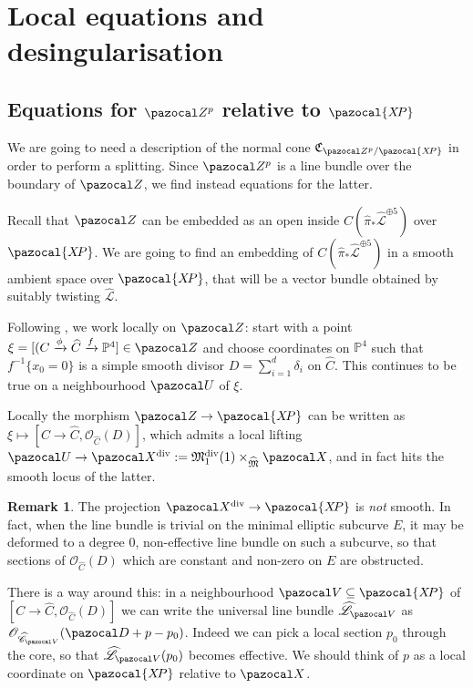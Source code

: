 \documentclass[11pt]{amsart}
\newcommand{\PP}{\mathbb P}
\newcommand{\OO}{\mathcal O}
\renewcommand{\to}{\rightarrow}
\newcommand{\X}{\pazocal X}
\newcommand{\XP}{\pazocal{X\!P}}
\newcommand{\hL}{\widehat{\mathcal L}}
\newcommand{\hC}{\widehat{\mathcal C}}
\newcommand{\Z}{\pazocal Z}
\newcommand{\MM}{\mathfrak M}
\newcommand{\hM}{\widehat{\mathfrak M}}
\newcommand{\Pic}{\operatorname{Pic}}
\theoremstyle{plain}
\theoremstyle{definition}
\newtheorem{remark}[thm]{Remark}
\begin{document}
\section{Local equations and desingularisation}\label{sec:equations}
\subsection{Equations for $\Z^p$ relative to $\XP$}
We are going to need a description of the normal cone $\mathfrak C_{\Z^p/\XP}$ in order to perform a splitting.
Since $\Z^p$ is a line bundle over the boundary of $\Z$, we find instead equations for the latter.

Recall that $\Z$ can be embedded as an open inside $C(\hat{\pi}_*\hL^{\oplus 5})$ over $\XP$. We are going to find an embedding of $C(\hat{\pi}_*\hL^{\oplus 5})$ in a smooth ambient space over $\XP$, that will be a vector bundle obtained by suitably twisting $\hL$.

Following \cite{HL}, we work locally on $\Z$: start with a point $\xi=[(C\xrightarrow{\phi}\widehat{C}\xrightarrow{f}\PP^4]\in\Z$ and choose coordinates on $\PP^4$ such that $f^{-1}\{x_0=0\}$ is a simple smooth divisor $D=\sum_{i=1}^d\delta_i$ on $\widehat{C}$. This continues to be true on a neighbourhood $\pazocal U$ of $\xi$.

 Locally the morphism $\Z\to\XP$ can be written as $\xi\mapsto[C\to\widehat{C},\OO_{\widehat{C}}(D)]$, which admits a local lifting $\pazocal U\to\X^{\rm{div}}:=\MM_1^{\rm{div}}(1)\times_{\hM}\X$, and in fact hits the smooth locus of the latter.
 
 \begin{remark}
  The projection $\X^{\rm{div}}\to \XP$ 
  is \emph{not} smooth. In fact, when the line bundle is trivial on the minimal elliptic subcurve $E$, it may be deformed to a degree $0$, non-effective line bundle on such a subcurve, so that sections of $\OO_{\widehat{C}}(D)$ which are constant and non-zero on $E$ are obstructed.

There is a way around this: in a neighbourhood $\pazocal V\subseteq \XP$ of $[C\to\widehat{C},\OO_{\widehat{C}}(D)]$ we can write the universal line bundle $\hL_{\pazocal V}$ as $\OO_{\hC_{\pazocal V}}(\pazocal D + p-p_0)$. Indeed we can pick a local section $p_0$ through the core, so that $\hL_{\pazocal V}(p_0)$ becomes effective. We should think of $p$ as a local coordinate on $\XP$ relative to $\X$.
\end{remark}
\end{document}
